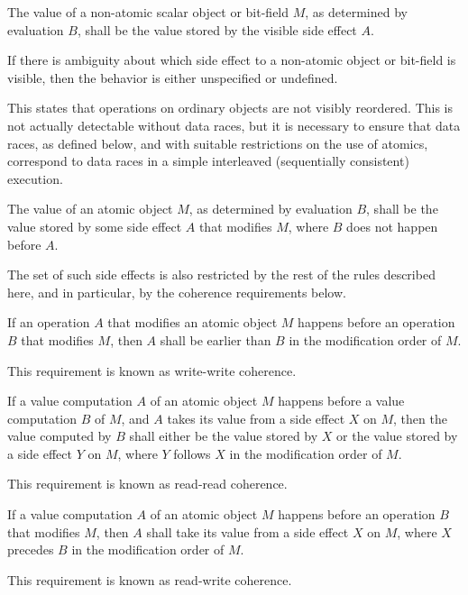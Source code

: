 The value of a non-atomic scalar object or bit-field $M$, as determined by
evaluation $B$, shall be the value stored by the
%
visible side effect $A$.
\begin{note}
If there is ambiguity about which side effect to a
non-atomic object or bit-field is visible, then the behavior is either
unspecified or undefined.
\end{note}
\begin{note}
This states that operations on
ordinary objects are not visibly reordered. This is not actually detectable
without data races, but it is necessary to ensure that data races, as defined
below, and with suitable restrictions on the use of atomics, correspond to data
races in a simple interleaved (sequentially consistent) execution.
\end{note}

\pnum
The value of an
atomic object $M$, as determined by evaluation $B$, shall be the value
stored by some
side effect $A$ that modifies $M$, where $B$ does not happen
before $A$.
\begin{note}
The set of such side effects is also restricted by the rest of the rules
described here, and in particular, by the coherence requirements below.
\end{note}

\pnum
{}%
If an operation $A$ that modifies an atomic object $M$ happens before
an operation $B$ that modifies $M$, then $A$ shall be earlier
than $B$ in the modification order of $M$.
\begin{note}
This requirement is known as write-write coherence.
\end{note}

\pnum
{}%
If a
%
value computation $A$ of an atomic object $M$ happens before a
value computation $B$ of $M$, and $A$ takes its value from a side
effect $X$ on $M$, then the value computed by $B$ shall either be
the value stored by $X$ or the value stored by a
%
side effect $Y$ on $M$,
where $Y$ follows $X$ in the modification order of $M$.
\begin{note}
This requirement is known as read-read coherence.
\end{note}

\pnum
{}%
If a
%
value computation $A$ of an atomic object $M$ happens before an
operation $B$ that modifies $M$, then $A$ shall take its value from a side
effect $X$ on $M$, where $X$ precedes $B$ in the
modification order of $M$.
\begin{note}
This requirement is known as
read-write coherence.
\end{note}

